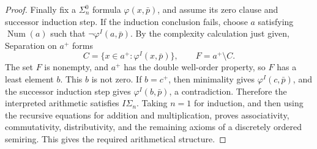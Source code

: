 \documentclass[11pt,a4paper]{article}
\theoremstyle{plain}
\theoremstyle{definition}
\theoremstyle{remark}
\begin{document}
\begin{proof}
  Finally fix a \(\Sigma_n^0\) formula \(\varphi(x,\bar p)\), and assume its zero clause and successor induction step. If the induction conclusion fails, choose \(a\) satisfying \(\operatorname{Num}(a)\) such that \(\neg\varphi^I(a,\bar p)\). By the complexity calculation just given, Separation on \(a^+\) forms
  \[
    C=\{x\in a^+:\varphi^I(x,\bar p)\},
    \qquad F=a^+\setminus C.
  \]
  The set \(F\) is nonempty, and \(a^+\) has the double well-order property, so \(F\) has a least element \(b\). This \(b\) is not zero. If \(b=c^+\), then minimality gives \(\varphi^I(c,\bar p)\), and the successor induction step gives \(\varphi^I(b,\bar p)\), a contradiction. Therefore the interpreted arithmetic satisfies \(I\Sigma_n\). Taking \(n=1\) for induction, and then using the recursive equations for addition and multiplication, proves associativity, commutativity, distributivity, and the remaining axioms of a discretely ordered semiring. This gives the required arithmetical structure.
\end{proof}
\end{document}
